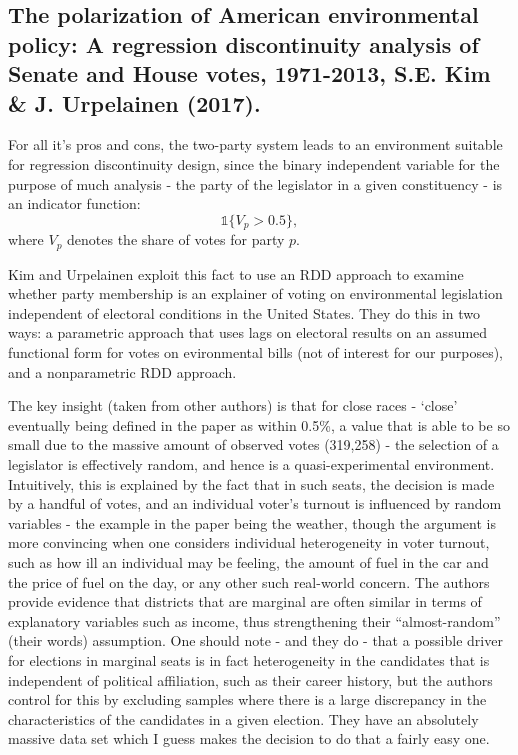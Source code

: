 \documentclass{article}
\begin{document}
\subsection{The polarization of American environmental policy: A regression discontinuity analysis of Senate and House votes, 1971-2013, S.E. Kim \& J. Urpelainen (2017)\cite{kim2017}.}
For all it's pros and cons, the two-party system leads to an environment suitable for regression discontinuity design, since the binary independent variable for the purpose of much analysis - the party of the legislator in a given constituency - is an indicator function:
\begin{equation} \mathds{1}\{V_{p}>0.5\},\end{equation}
where $V_{p}$ denotes the share of votes for party $p$. 

Kim and Urpelainen exploit this fact to use an RDD approach to examine whether party membership is an explainer of voting on environmental legislation independent of electoral conditions in the United States. They do this in two ways: a parametric approach that uses lags on electoral results on an assumed functional form for votes on evironmental bills (not of interest for our purposes), and a nonparametric RDD approach.

The key insight (taken from other authors) is that for close races - `close' eventually being defined in the paper as within 0.5\%, a value that is able to be so small due to the massive amount of observed votes (319,258) - the selection of a legislator is effectively random, and hence is a quasi-experimental environment. Intuitively, this is explained by the fact that in such seats, the decision is made by a handful of votes, and an individual voter's turnout is influenced by random variables - the example in the paper being the weather, though the argument is more convincing when one considers individual heterogeneity in voter turnout, such as how ill an individual may be feeling, the amount of fuel in the car and the price of fuel on the day, or any other such real-world concern. The authors provide evidence that districts that are marginal are often similar in terms of explanatory variables such as income, thus strengthening their ``almost-random'' (their words) assumption. One should note - and they do - that a possible driver for elections in marginal seats is in fact heterogeneity in the candidates that is independent of political affiliation, such as their career history, but the authors control for this by excluding samples where there is a large discrepancy in the characteristics of the candidates in a given election. They have an absolutely massive data set which I guess makes the decision to do that a fairly easy one.
\end{document}
